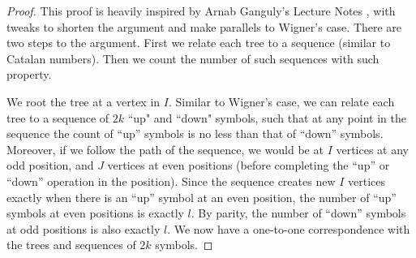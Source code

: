 \begin{proof}
    This proof is heavily inspired by Arnab Ganguly's Lecture Notes \cite{wiscnotes}, with tweaks to shorten the argument and make parallels to Wigner's case.
    There are two steps to the argument. First we relate each tree to a sequence (similar to Catalan numbers). Then we count the number of such sequences with such property.

    We root the tree at a vertex in $I$. Similar to Wigner's case, we can relate each tree to a sequence of $2k$ ``up" and ``down" symbols, such that at any point in the sequence the count of ``up'' symbols is no less than that of ``down'' symbols. Moreover, if we follow the path of the sequence, we would be at $I$ vertices at any odd position, and $J$ vertices at even positions (before completing the ``up'' or ``down'' operation in the position). Since the sequence creates new $I$ vertices exactly when there is an ``up'' symbol at an even position, the number of ``up'' symbols at even positions is exactly $l$. By parity, the number of ``down'' symbols at odd positions is also exactly $l$. We now have a one-to-one correspondence with the trees and sequences of $2k$ symbols.


\end{proof}
